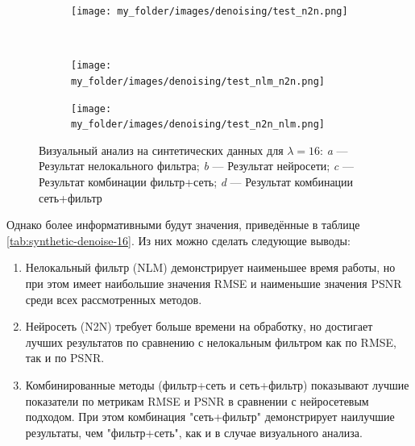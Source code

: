 \begin{figure}[H]
\begin{subfigure}[t]{\dimexpr.5\linewidth-1.3em\relax}
	\end{subfigure}
	\hfill %
	\begin{subfigure}[t]{\dimexpr.5\linewidth-1.3em\relax}
		\centering
		\texttt{[image: my\_folder/images/denoising/test\_n2n.png]}
	\end{subfigure}
	\\[20pt]
	\begin{subfigure}[t]{\dimexpr.5\linewidth-1.3em\relax}
		\centering
		\texttt{[image: my\_folder/images/denoising/test\_nlm\_n2n.png]}
	\end{subfigure}%
	\hfill %
	\begin{subfigure}[t]{\dimexpr.5\linewidth-1.3em\relax}
		\centering
		\texttt{[image: my\_folder/images/denoising/test\_n2n\_nlm.png]}
	\end{subfigure}
	\captionsetup{justification=centering} %
	\caption{Визуальный анализ на синтетических данных для $\lambda=16$: {\itshape a} --- Результат нелокального фильтра; {\itshape b} --- Результат нейросети; {\itshape c} --- Результат комбинации фильтр+сеть; {\itshape d} --- Результат комбинации сеть+фильтр} 
	\label{fig:synthetic-denoise-16}
\end{figure}
\par Однако более информативными будут значения, приведённые в таблице \ref{tab:synthetic-denoise-16}. Из них можно сделать следующие выводы:
\begin{enumerate}
	\item Нелокальный фильтр (NLM) демонстрирует наименьшее время работы, но при этом имеет наибольшие значения RMSE и наименьшие значения PSNR среди всех рассмотренных методов.
	\item Нейросеть (N2N) требует больше времени на обработку, но достигает лучших результатов по сравнению с нелокальным фильтром как по RMSE, так и по PSNR.
	\item Комбинированные методы (фильтр+сеть и сеть+фильтр) показывают лучшие показатели по метрикам RMSE и PSNR в сравнении с нейросетевым подходом. При этом комбинация "сеть+фильтр" демонстрирует наилучшие результаты, чем "фильтр+сеть", как и в случае визуального анализа.
\end{enumerate}  
